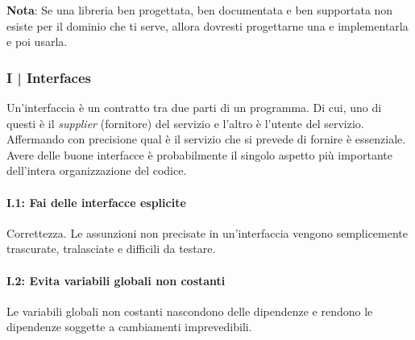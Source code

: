 \textsf{\small \textbf{Nota}: Se una libreria ben progettata, ben documentata e ben supportata non esiste per il dominio che ti serve, allora dovresti progettarne una e implementarla e poi usarla.} \\


\subsubsection{I | Interfaces}

\textsf{\small Un'interfaccia è un contratto tra due parti di un programma. Di cui, uno di questi è il \emph{supplier} (fornitore) del servizio e l'altro è l'utente del servizio. Affermando con precisione qual è il servizio che si prevede di fornire è essenziale.} \\

\textsf{\small Avere delle buone interfacce è probabilmente il singolo aspetto più importante dell'intera organizzazione del codice.} \\

\paragraph{I.1: Fai delle interfacce esplicite}

\textsf{\small Correttezza. Le assunzioni non precisate in un'interfaccia vengono semplicemente trascurate, tralasciate e difficili da testare. } \\

\paragraph{I.2: Evita variabili globali non costanti}

\textsf{\small Le variabili globali non costanti nascondono delle dipendenze e rendono le dipendenze soggette a cambiamenti imprevedibili.} \\

